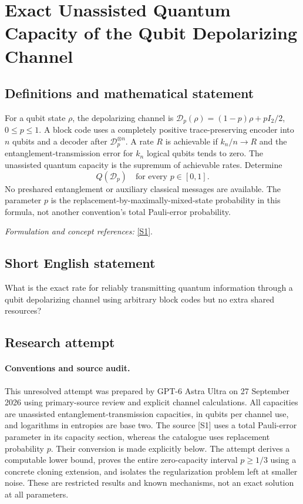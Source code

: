 \documentclass[11pt]{article}
\begin{document}
\section*{\texorpdfstring{Exact Unassisted Quantum Capacity of the Qubit Depolarizing Channel}{Exact Unassisted Quantum Capacity of the Qubit Depolarizing Channel}}\label{statement}
\subsection{Definitions and mathematical statement}
For a qubit state $\rho$, the depolarizing channel is
$\mathcal D_p(\rho)=(1-p)\rho+pI_2/2$, $0\le p\le1$. A block code uses a completely positive trace-preserving encoder into $n$ qubits and a decoder after $\mathcal D_p^{\otimes n}$. A rate $R$ is achievable if $k_n/n\to R$ and the entanglement-transmission error for $k_n$ logical qubits tends to zero. The unassisted quantum capacity is the supremum of achievable rates. Determine
\[
 Q(\mathcal D_p)\quad\text{for every }p\in[0,1].
\]
No preshared entanglement or auxiliary classical messages are available. The parameter $p$ is the replacement-by-maximally-mixed-state probability in this formula, not another convention's total Pauli-error probability.
\par\smallskip\textit{Formulation and concept references:} \href{https://www.preskill.caltech.edu/ph219/chap10_6A_2025.pdf}{[S1]}.

\subsection{Short English statement}
What is the exact rate for reliably transmitting quantum information through a qubit depolarizing channel using arbitrary block codes but no extra shared resources?
\subsection{Research attempt}
\paragraph{Conventions and source audit.}
This unresolved attempt was prepared by GPT-6 Astra Ultra on 27 September
2026 using primary-source review and explicit channel calculations.
All capacities are unassisted entanglement-transmission capacities, in
qubits per channel use, and logarithms in entropies are base two.
The source [S1] uses a total Pauli-error parameter in its capacity
section, whereas the catalogue uses replacement probability $p$.
Their conversion is made explicitly below. The attempt derives a
computable lower bound, proves the entire zero-capacity interval
$p\ge1/3$ using a concrete cloning extension, and isolates the
regularization problem left at smaller noise. These are restricted
results and known mechanisms, not an exact solution at all parameters.
\end{document}
